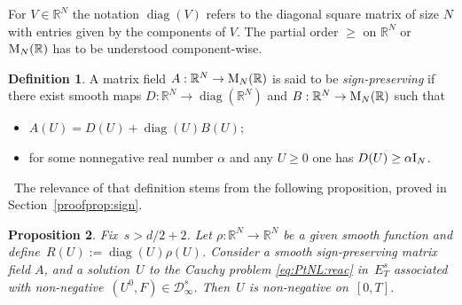 \documentclass[10pt]{amsart}
\DeclareMathOperator{\diag}{diag}
\newtheorem{prop}{Proposition}[section]
\theoremstyle{definition}
\newtheorem{defi}[prop]{Definition}
\newcommand\R{\mathbb{R}}
\begin{document}
For $V\in\R^N$ the notation $\diag(V)$ refers to the diagonal square matrix of size $N$ with entries given by the components of $V$. The partial order $\geq$ on $\R^N$ or $\textnormal{M}_N(\R)$ has to be understood component-wise.
\begin{defi}\label{def:nonneg}
A matrix field $A:\R^N\to\textnormal{M}_N(\R)$ is said to be \emph{sign-preserving} if there exist smooth maps $D:\R^N\to\diag(\R^N)$ and $B:\R^N\to \textnormal{M}_N(\R)$ such that
\begin{itemize}
\item
$A(U)= D(U)+\diag(U)B(U)$;
\item
for some nonnegative real number $\alpha$ and any $U\geq 0$ one has $D(U)\geq \alpha\textnormal{I}_N$.
\end{itemize}
\end{defi} \
The relevance of that definition stems from the following proposition, proved in Section~\ref{proofprop:sign}.
\begin{prop}\label{prop:sign}
Fix~$s>d/2+2$. Let $\rho:\R^N\to\R^N$ be a given smooth function and define~$R(U):=\diag(U)\rho(U)$. Consider a smooth sign-preserving matrix field $A$, and a solution~$U$ to the Cauchy problem \eqref{eq:PtNL:reac}
in~$E_T^s$ associated with
non-negative~$(U^0,F)\in\mathcal{D}_\infty^s$. Then~$U$ is non-negative on~$[0,T]$.
\end{prop}
\end{document}
